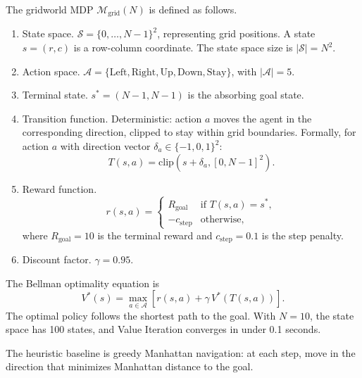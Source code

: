 \begin{definition}
\label{def:gridworld_mdp}
The gridworld MDP $\mathcal{M}_{\mathrm{grid}}(N)$ is defined as follows.
\begin{enumerate}
    \item State space. $\mathcal{S} = \{0, \ldots, N-1\}^2$, representing grid positions. A state $s = (r, c)$ is a row-column coordinate. The state space size is $|\mathcal{S}| = N^2$.
    \item Action space. $\mathcal{A} = \{\text{Left}, \text{Right}, \text{Up}, \text{Down}, \text{Stay}\}$, with $|\mathcal{A}| = 5$.
    \item Terminal state. $s^* = (N-1, N-1)$ is the absorbing goal state.
    \item Transition function. Deterministic: action $a$ moves the agent in the corresponding direction, clipped to stay within grid boundaries. Formally, for action $a$ with direction vector $\delta_a \in \{-1, 0, 1\}^2$:
    \begin{equation}
    \label{eq:gridworld_transition}
    T(s, a) = \mathrm{clip}(s + \delta_a, [0, N-1]^2).
    \end{equation}
    \item Reward function.
    \begin{equation}
    \label{eq:gridworld_reward}
    r(s, a) = \begin{cases}
    R_{\mathrm{goal}} & \text{if } T(s,a) = s^*, \\
    -c_{\mathrm{step}} & \text{otherwise},
    \end{cases}
    \end{equation}
    where $R_{\mathrm{goal}} = 10$ is the terminal reward and $c_{\mathrm{step}} = 0.1$ is the step penalty.
    \item Discount factor. $\gamma = 0.95$.
\end{enumerate}
\end{definition}

The Bellman optimality equation is
\begin{equation}
\label{eq:gridworld_bellman}
V^*(s) = \max_{a \in \mathcal{A}} \left[ r(s, a) + \gamma \, V^*(T(s, a)) \right].
\end{equation}
The optimal policy follows the shortest path to the goal. With $N = 10$, the state space has 100 states, and Value Iteration converges in under 0.1 seconds.

The heuristic baseline is greedy Manhattan navigation: at each step, move in the direction that minimizes Manhattan distance to the goal.

